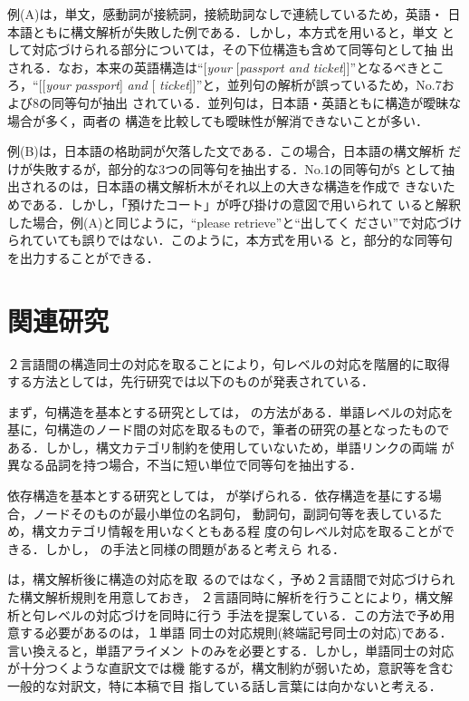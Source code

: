 例(A)は，単文，感動詞が接続詞，接続助詞なしで連続しているため，英語・
日本語ともに構文解析が失敗した例である．しかし，本方式を用いると，単文
として対応づけられる部分については，その下位構造も含めて同等句として抽
出される．なお，本来の英語構造は``[{\em your} [{\em passport and
ticket}]]''となるべきところ，``[[{\em your passport}] {\em and} [{\em
ticket}]]''と，並列句の解析が誤っているため，No.7および8の同等句が抽出
されている．並列句は，日本語・英語ともに構造が曖昧な場合が多く，両者の
構造を比較しても曖昧性が解消できないことが多い．

例(B)は，日本語の格助詞が欠落した文である．この場合，日本語の構文解析
だけが失敗するが，部分的な3つの同等句を抽出する．No.1の同等句が{\tt S}
として抽出されるのは，日本語の構文解析木がそれ以上の大きな構造を作成で
きないためである．しかし，「預けたコート」が呼び掛けの意図で用いられて
いると解釈した場合，例(A)と同じように，``please retrieve''と``出してく
ださい''で対応づけられていても誤りではない．このように，本方式を用いる
と，部分的な同等句を出力することができる．


\section{関連研究}

２言語間の構造同士の対応を取ることにより，句レベルの対応を階層的に取得
する方法としては，先行研究では以下のものが発表されている．

まず，句構造を基本とする研究としては，
の方法がある．単語レベルの対応を
基に，句構造のノード間の対応を取るもので，筆者の研究の基となったもので
ある．しかし，構文カテゴリ制約を使用していないため，単語リンクの両端
が異なる品詞を持つ場合，不当に短い単位で同等句を抽出する．

依存構造を基本とする研究としては，
が挙げられる．依存構造を基にする場合，ノードそのものが最小単位の名詞句，
動詞句，副詞句等を表しているため，構文カテゴリ情報を用いなくともある程
度の句レベル対応を取ることができる．しかし，
 の手法と同様の問題があると考えら
れる．

は，構文解析後に構造の対応を取
るのではなく，予め２言語間で対応づけられた構文解析規則を用意しておき，
２言語同時に解析を行うことにより，構文解析と句レベルの対応づけを同時に行う
手法を提案している．この方法で予め用意する必要があるのは，１単語
同士の対応規則(終端記号同士の対応)である．言い換えると，単語アライメン
トのみを必要とする．しかし，単語同士の対応が十分つくような直訳文では機
能するが，構文制約が弱いため，意訳等を含む一般的な対訳文，特に本稿で目
指している話し言葉には向かないと考える．

